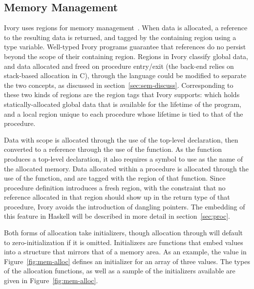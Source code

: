 \subsection{Memory Management}
\label{sec:ref}

Ivory uses regions for memory management~\cite{memarea}.  When data is allocated, a reference
to the resulting data is returned, and tagged by the containing region using a
type variable.  Well-typed Ivory programs guarantee that references do no
persist beyond the scope of their containing region.  Regions in Ivory classify
global data, and data allocated and freed on procedure entry/exit (the back-end
relies on stack-based allocation in C), through the language could be modified
to separate the two concepts, as discussed in section~\ref{sec:sem-discuss}.
Corresponding to these two kinds of regions are the region tags that Ivory
supports:  which holds statically-allocated global data that is
available for the lifetime of the program, and a local region unique to each
procedure whose lifetime is tied to that of the procedure.

Data with  scope is allocated through the use of the 
top-level declaration, then converted to a reference through the use of the
 function.  As the  function produces a top-level
declaration, it also requires a symbol to use as the name of the allocated
memory.  Data allocated within a procedure is allocated through the use of the
 function, and are tagged with the region of that function.  Since
procedure definition introduces a fresh region, with the constraint that no
reference allocated in that region should show up in the return type of that
procedure, Ivory avoids the introduction of dangling pointers.  The embedding of
this feature in Haskell will be described in more detail in
section~\ref{sec:proc}.

Both forms of allocation take initializers, though  allocation
through  will default to zero-initialization if it is omitted.
Initializers are functions that embed values into a structure that mirrors that
of a memory area.  As an example, the  value in
Figure~\ref{fig:mem-alloc} defines an initializer for an array of three
 values.  The types of the allocation functions, as well as a sample
of the initializers available are given in Figure~\ref{fig:mem-alloc}.

